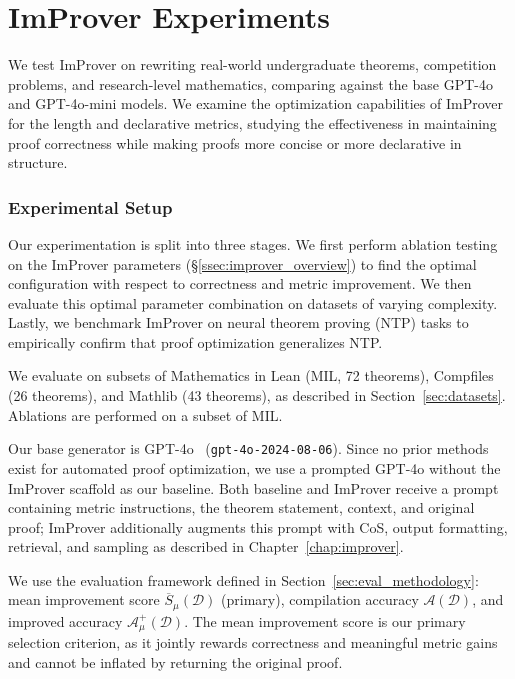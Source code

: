 \chapter{ImProver Experiments}\label{chap:improver-exp}

\setlength{\parindent}{1em}

We test ImProver on rewriting real-world undergraduate theorems, competition problems, and research-level mathematics, comparing against the base GPT-4o and GPT-4o-mini models. We examine the optimization capabilities of ImProver for the length and declarative metrics, studying the effectiveness in maintaining proof correctness while making proofs more concise or more declarative in structure.

\subsection{Experimental Setup}

Our experimentation is split into three stages. We first perform ablation testing on the ImProver parameters (\S\ref{ssec:improver_overview}) to find the optimal configuration with respect to correctness and metric improvement. We then evaluate this optimal parameter combination on datasets of varying complexity. Lastly, we benchmark ImProver on neural theorem proving (NTP) tasks to empirically confirm that proof optimization generalizes NTP.

We evaluate on subsets of Mathematics in Lean (MIL, 72 theorems), Compfiles (26 theorems), and Mathlib (43 theorems), as described in Section~\ref{sec:datasets}. Ablations are performed on a subset of MIL.

Our base generator is GPT-4o~\cite{openai2024gpt4technicalreport} (\texttt{gpt-4o-2024-08-06}). Since no prior methods exist for automated proof optimization, we use a prompted GPT-4o without the ImProver scaffold as our baseline. Both baseline and ImProver receive a prompt containing metric instructions, the theorem statement, context, and original proof; ImProver additionally augments this prompt with CoS, output formatting, retrieval, and sampling as described in Chapter~\ref{chap:improver}.

We use the evaluation framework defined in Section~\ref{sec:eval_methodology}: mean improvement score $\overline{S}_\mu(\mathcal{D})$ (primary), compilation accuracy $\mathcal{A}(\mathcal{D})$, and improved accuracy $\mathcal{A}^+_\mu(\mathcal{D})$. The mean improvement score is our primary selection criterion, as it jointly rewards correctness and meaningful metric gains and cannot be inflated by returning the original proof.

